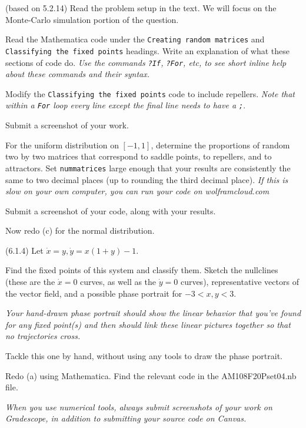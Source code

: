 \documentclass[12pt,letterpaper,noanswers]{exam}
\begin{document}
\begin{questions}
\question (based on 5.2.14)  Read the problem setup in the text.  We will focus on the Monte-Carlo simulation portion of the question.
\begin{parts}
\item Read the Mathematica code under the \texttt{Creating random matrices} and \texttt{Classifying the fixed points} headings.  Write an explanation of what these sections of code do.  \emph{Use the commands \texttt{?If}, \texttt{?For}, etc, to see short inline help about these commands and their syntax.}
\item Modify the \texttt{Classifying the fixed points} code to include repellers.  \emph{Note that within a \texttt{For} loop every line except the final line needs to have a \texttt{;}}.

Submit a screenshot of your work.
\item For the uniform distribution on $[-1,1]$, determine the proportions of random two by two matrices that correspond to saddle points, to repellers, and to attractors.  Set \texttt{nummatrices} large enough that your results are consistently the same to two decimal places (up to rounding the third decimal place).  \emph{If this is slow on your own computer, you can run your code on wolframcloud.com}

Submit a screenshot of your code, along with your results.
\item Now redo (c) for the normal distribution.
\end{parts}

\question (6.1.4) Let $\dot{x} = y, \dot{y} = x(1+y)-1$.  
\begin{parts}
\item Find the fixed points of this system and classify them.  Sketch the nullclines (these are the $\dot{x} = 0$ curves, as well as the $\dot{y} = 0$ curves), representative vectors of the vector field, and a possible phase portrait for $-3<x,y<3$.  

\emph{Your hand-drawn phase portrait should show the linear behavior that you've found for any fixed point(s) and then should link these linear pictures together so that no trajectories cross.}

Tackle this one by hand, without using any tools to draw the phase portrait.

\item Redo (a) using Mathematica.  Find the relevant code in the AM108F20Pset04.nb file.

\emph{When you use numerical tools, always submit screenshots of your work on Gradescope, in addition to submitting your source code on Canvas.}


\end{parts}
\end{questions}
\end{document}
